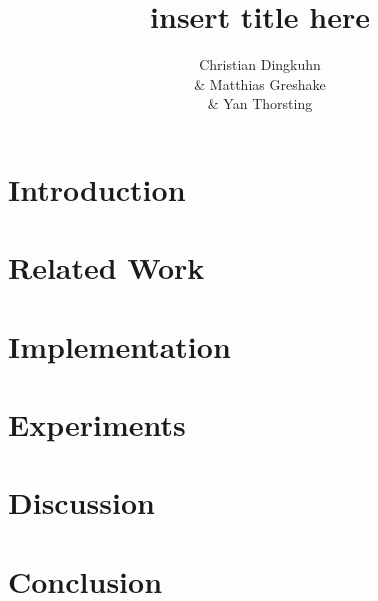 \documentclass[11pt,a4paper,oneside]{article}
\begin{document}
\title{insert title here}
\author{Christian Dingkuhn\\ & Matthias Greshake\\ & Yan Thorsting}

\maketitle
\vskip 1cm
\vfill
\abstract{}
\vskip 1cm
\thispagestyle{empty}

\newpage
\setcounter{tocdepth}{2}
\tableofcontents
\newpage


\section{Introduction}


\section{Related Work}


\section{Implementation}


\section{Experiments}


\section{Discussion}


\section{Conclusion}




\end{document}
